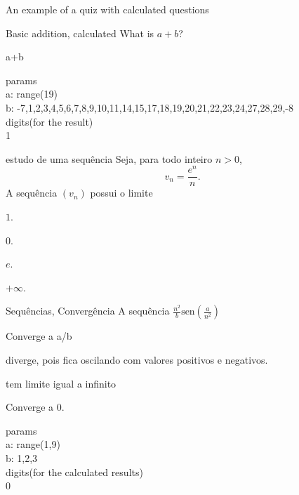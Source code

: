 \documentclass[12pt]{article}
\begin{document}
\begin{quiz}{An example of a quiz with calculated questions}
\begin{numerical}[points=2]{Basic addition, calculated}
  What is ${a}+{b}$?
  \item {a}+{b}
  \end{numerical}
  params\\
  a: range(19)\\
  b: -7,1,2,3,4,5,6,7,8,9,10,11,14,15,17,18,19,20,21,22,23,24,27,28,29,-8\\
  digits(for the result)\\
  1

  \begin{multi}{estudo de uma sequência}
  Seja, para todo inteiro $n>0$, \[v_n=\frac{e^n}{n}.\]
  A sequência $(v_n)$ possui o limite
  \item $1$.
  \item $0$.
  \item $e$.
  \item* $+\infty$.
  \end{multi}


\begin{multi}[multiple]{Sequências, Convergência}
A sequência $\displaystyle \frac{n^2}{{b}} \text{sen}\left(\frac{{a}}{n^{2}}\right)$
\item* Converge a {a}/{b}
\item diverge, pois fica oscilando com valores positivos e negativos.
\item tem limite igual a infinito
\item Converge a 0.
\end{multi}

params\\
a: range(1,9)\\
b: 1,2,3\\
digits(for the calculated results)\\
0
\end{quiz}
\end{document}
